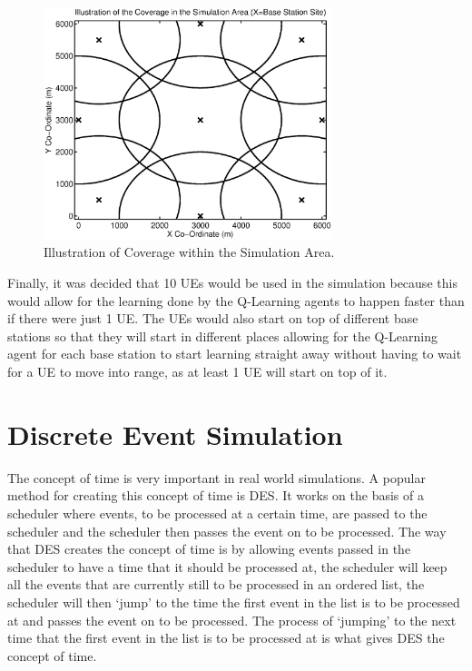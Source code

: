 \begin{figure}[H]
  \begin{center}
    	  \includegraphics[width=0.75\textwidth]{figures/simulation/coverage.eps}
    \end{center}
    \caption{Illustration of Coverage within the Simulation Area.}
    \label{fig:cov}
\end{figure}

Finally, it was decided that 10 UEs would be used in the simulation because this would allow for the learning done by the Q-Learning agents to happen faster than if there were just 1 UE. The UEs would also start on top of different base stations so that they will start in different places allowing for the Q-Learning agent for each base station to start learning straight away without having to wait for a UE to move into range, as at least 1 UE will start on top of it.
\section{Discrete Event Simulation}
The concept of time is very important in real world simulations. A popular method for creating this concept of time is \ac{DES}. It works on the basis of a scheduler where events, to be processed at a certain time, are passed to the scheduler and the scheduler then passes the event on to be processed. The way that \ac{DES} creates the concept of time is by allowing events passed in the scheduler to have a time that it should be processed at, the scheduler will keep all the events that are currently still to be processed in an ordered list, the scheduler will then `jump' to the time the first event in the list is to be processed at and passes the event on to be processed. The process of `jumping' to the next time that the first event in the list is to be processed at is what gives \ac{DES} the concept of time.

